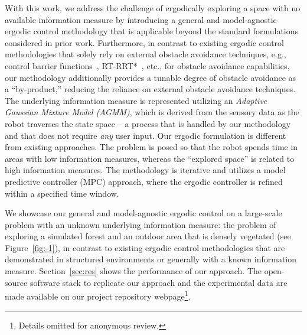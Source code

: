 \documentclass[letterpaper, 10 pt, conference, twoside]{IEEEtran}
\theoremstyle{definition}
\begin{document}
With this work, we address the challenge of ergodically exploring a space with no available information measure by introducing a general and model-agnostic ergodic control methodology that is applicable beyond the standard formulations considered in prior work. Furthermore, in contrast to existing ergodic control methodologies that solely rely on external obstacle avoidance techniques, e.g., control barrier functions~\cite{lerch2023safety}, RT-RRT*~\cite{prabhakar2020ergodic}, etc., for obstacle avoidance capabilities, our methodology additionally provides a tunable degree of obstacle avoidance as a ``by-product,'' reducing the reliance on external obstacle avoidance techniques.  
%
The underlying information measure is represented utilizing an \textit{Adaptive Gaussian Mixture Model (AGMM)}, which is derived from the sensory data as the robot traverses the state space -- a process that is handled by our methodology and that does not require \textit{any} user input. Our ergodic formulation is different from existing approaches. The problem is posed so that the robot spends time in areas with low information measures, whereas the ``explored space'' is related to high information measures. The methodology is iterative and utilizes a model predictive controller (MPC) approach, where the ergodic controller is refined within a specified time window.

We showcase our general and model-agnostic ergodic control on a large-scale problem with an unknown underlying information measure: the problem of exploring a simulated forest and an outdoor area that is densely vegetated (see Figure~\ref{fig:-1}), in contrast to existing ergodic control methodologies that are demonstrated in structured environments or generally with a known information measure. Section~\ref{sec:res} shows the performance of our approach. The open-source software stack to replicate our approach and the experimental data are made available on our project repository webpage\footnote{Details omitted for anonymous review.}.%
\end{document}
